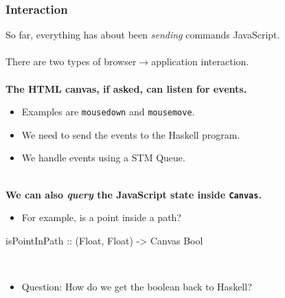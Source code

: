 \documentclass{beamer}
\begin{document}
\begin{frame}[fragile]
\frametitle{Interaction}

So far, everything has about been {\em sending\/} commands JavaScript.\\
~\\

There are two types of browser${}\rightarrow{}$application interaction.\\
~\\

{\bf The HTML canvas, if asked, can listen for events.}
\begin{itemize}
\item Examples are \verb|mousedown| and \verb|mousemove|.
\item We need to send the events to the Haskell program.
\item We handle events using a STM Queue.
\end{itemize}
~\\
{\bf We can also {\em query\/} the JavaScript state inside \verb|Canvas|.}
\begin{itemize}
\item For example, is a point inside a path?
\end{itemize}
\begin{codeblock}[0.8]
\begin{semiverbatim}
isPointInPath :: (Float, Float) -> Canvas Bool
\end{semiverbatim}
\end{codeblock}
~\\
\begin{itemize}
\item Question: How do we get the boolean back to Haskell?
\end{itemize}
\end{frame}
\end{document}
